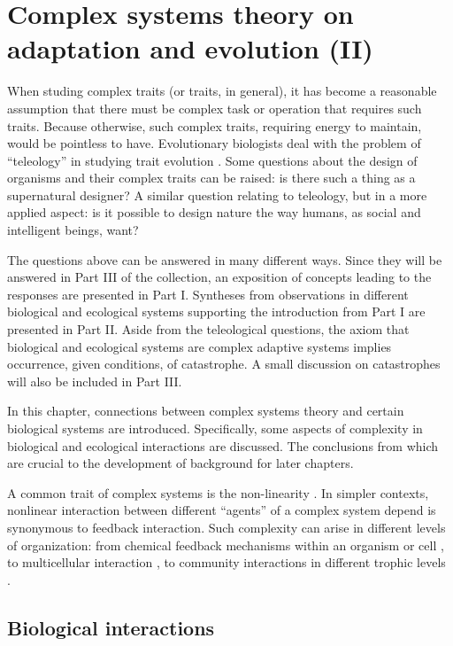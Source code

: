 \chapter{Complex systems theory on adaptation and evolution (II)}

When studing complex traits (or traits, in general), it has become a reasonable assumption that there must be complex task or operation that requires such traits.
Because otherwise, such complex traits, requiring energy to maintain, would be pointless to have.
Evolutionary biologists deal with the problem of ``teleology'' in studying trait evolution \cite{Veloso2019}.
Some questions about the design of organisms and their complex traits can be raised: is there such a thing as a supernatural designer?
A similar question relating to teleology, but in a more applied aspect: is it possible to design nature the way humans, as social and intelligent beings, want?

The questions above can be answered in many different ways.
Since they will be answered in Part III of the collection, an exposition of concepts leading to the responses are presented in Part I.
Syntheses from observations in different biological and ecological systems supporting the introduction from Part I are presented in Part II.
Aside from the teleological questions, the axiom that biological and ecological systems are complex adaptive systems \cite{Dong2019} implies occurrence, given conditions, of catastrophe.
A small discussion on catastrophes will also be included in Part III.

In this chapter, connections between complex systems theory and certain biological systems are introduced.
Specifically, some aspects of complexity in biological and ecological interactions are discussed.
The conclusions from which are crucial to the development of background for later chapters.

A common trait of complex systems is the non-linearity \cite{Devaney}.
In simpler contexts, nonlinear interaction between different ``agents'' of a complex system depend is synonymous to feedback interaction.
Such complexity can arise in different levels of organization: from chemical feedback mechanisms within an organism or cell \cite{Chaves2019}, to multicellular interaction \cite{Veloso2017}, to community interactions in different trophic levels \cite{Seibold2018}.

\section{Biological interactions}
